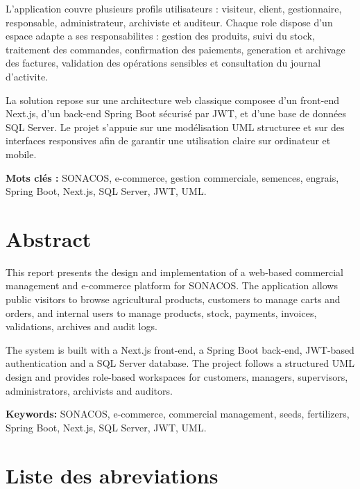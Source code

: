 \documentclass[12pt,a4paper]{report}
\begin{document}
L'application couvre plusieurs profils utilisateurs : visiteur, client, gestionnaire, responsable, administrateur, archiviste et auditeur. Chaque role dispose d'un espace adapte a ses responsabilites : gestion des produits, suivi du stock, traitement des commandes, confirmation des paiements, generation et archivage des factures, validation des opérations sensibles et consultation du journal d'activite.

La solution repose sur une architecture web classique composee d'un front-end Next.js, d'un back-end Spring Boot sécurisé par JWT, et d'une base de données SQL Server. Le projet s'appuie sur une modélisation UML structuree et sur des interfaces responsives afin de garantir une utilisation claire sur ordinateur et mobile.

\textbf{Mots clés :} SONACOS, e-commerce, gestion commerciale, semences, engrais, Spring Boot, Next.js, SQL Server, JWT, UML.

\chapter*{Abstract}

This report presents the design and implementation of a web-based commercial management and e-commerce platform for SONACOS. The application allows public visitors to browse agricultural products, customers to manage carts and orders, and internal users to manage products, stock, payments, invoices, validations, archives and audit logs.

The system is built with a Next.js front-end, a Spring Boot back-end, JWT-based authentication and a SQL Server database. The project follows a structured UML design and provides role-based workspaces for customers, managers, supervisors, administrators, archivists and auditors.

\textbf{Keywords:} SONACOS, e-commerce, commercial management, seeds, fertilizers, Spring Boot, Next.js, SQL Server, JWT, UML.

\listoffigures
{}

\listoftables
{}

\chapter*{Liste des abreviations}
\end{document}
